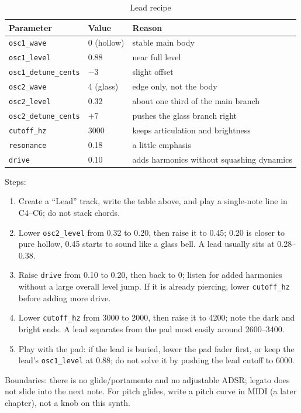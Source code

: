 \begin{table}[htbp]
\centering
\small
\begin{tabular}{@{}lll@{}}
\hline
Parameter & Value & Reason \\
\hline
\texttt{osc1\_wave} & 0 (hollow) & stable main body \\
\texttt{osc1\_level} & 0.88 & near full level \\
\texttt{osc1\_detune\_cents} & $-3$ & slight offset \\
\texttt{osc2\_wave} & 4 (glass) & edge only, not the body \\
\texttt{osc2\_level} & 0.32 & about one third of the main branch \\
\texttt{osc2\_detune\_cents} & $+7$ & pushes the glass branch right \\
\texttt{cutoff\_hz} & 3000 & keeps articulation and brightness \\
\texttt{resonance} & 0.18 & a little emphasis \\
\texttt{drive} & 0.10 & adds harmonics without squashing dynamics \\
\hline
\end{tabular}
\caption{Lead recipe}
\label{tab:lead-recipe}
\end{table}

Steps:

\begin{enumerate}
  \item Create a ``Lead'' track, write the table above, and play a single-note line in C4--C6; do not stack chords.
  \item Lower \texttt{osc2\_level} from 0.32 to 0.20, then raise it to 0.45; 0.20 is closer to pure hollow, 0.45 starts to sound like a glass bell. A lead usually sits at 0.28--0.38.
  \item Raise \texttt{drive} from 0.10 to 0.20, then back to 0; listen for added harmonics without a large overall level jump. If it is already piercing, lower \texttt{cutoff\_hz} before adding more drive.
  \item Lower \texttt{cutoff\_hz} from 3000 to 2000, then raise it to 4200; note the dark and bright ends. A lead separates from the pad most easily around 2600--3400.
  \item Play with the pad: if the lead is buried, lower the pad fader first, or keep the lead's \texttt{osc1\_level} at 0.88; do not solve it by pushing the lead cutoff to 6000.
\end{enumerate}

Boundaries: there is no glide/portamento and no adjustable ADSR; legato does not slide into the next note. For pitch glides, write a pitch curve in MIDI (a later chapter), not a knob on this synth.

